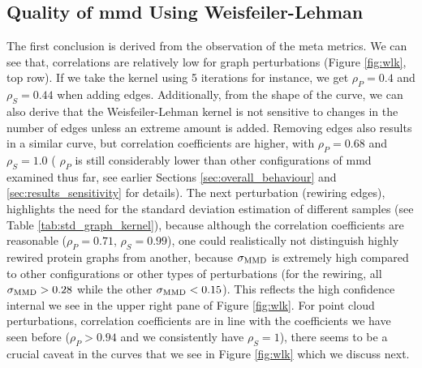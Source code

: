 \subsection{Quality of \gls{mmd} Using Weisfeiler-Lehman}\label{sec:quality_wl}
The first conclusion is
derived from the observation of the meta metrics. We can see that, correlations
are relatively low for graph perturbations (Figure \ref{fig:wlk}, top row). If
we take the kernel using 5 iterations for instance, we get $\rho_P=0.4$ and
$\rho_S=0.44$ when adding edges. Additionally, from the shape of the curve, we
can also derive that the Weisfeiler-Lehman kernel is not sensitive to changes in
the number of edges unless an extreme amount is added. Removing edges also
results in a similar curve, but correlation coefficients are higher, with
$\rho_P=0.68$ and $\rho_S=1.0$ ( $\rho_P$ is still considerably lower than other
configurations of \gls{mmd} examined thus far, see earlier Sections
\ref{sec:overall_behaviour} and \ref{sec:results_sensitivity} for details). The
next perturbation (rewiring edges), highlights the need for the standard
deviation estimation of different samples (see Table
\ref{tab:std_graph_kernel}), because although the correlation coefficients are
reasonable ($\rho_P=0.71$, $\rho_S=0.99$), one could realistically not
distinguish highly rewired protein graphs from another, because $\sigma_{\text{MMD}}$ is
extremely high compared to other configurations or other types of perturbations
(for the rewiring, all $\sigma_{\text{MMD}}>0.28$ while the other $\sigma_{\text{MMD}}<0.15$).
This reflects the high confidence internal we see in the upper right pane of
Figure \ref{fig:wlk}. For point cloud perturbations, correlation coefficients
are in line with the coefficients we have seen before ($\rho_P>0.94$ and we
consistently have $\rho_S=1$), there seems to be a crucial caveat in the curves
that we see in Figure \ref{fig:wlk} which we discuss next.

